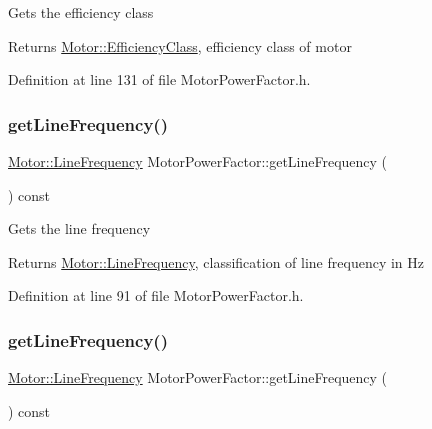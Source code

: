 Gets the efficiency class

\begin{DoxyReturn}{Returns}
\hyperlink{class_motor_afa022971ae062406a9f588c601673d4e}{Motor\+::\+Efficiency\+Class}, efficiency class of motor 
\end{DoxyReturn}


Definition at line 131 of file Motor\+Power\+Factor.\+h.

\mbox{\label{class_motor_power_factor_aa4cdc420b1f611bcb9f4a69c69c1fabf}} 
\subsubsection{\texorpdfstring{get\+Line\+Frequency()}{getLineFrequency()}\hspace{0.1cm}{\footnotesize\ttfamily [1/3]}}
{\footnotesize\ttfamily \hyperlink{class_motor_acee1bdf1b684ad36cb80dc2829d9fcee}{Motor\+::\+Line\+Frequency} Motor\+Power\+Factor\+::get\+Line\+Frequency (\begin{DoxyParamCaption}{ }\end{DoxyParamCaption}) const\hspace{0.3cm}{\ttfamily [inline]}}

Gets the line frequency

\begin{DoxyReturn}{Returns}
\hyperlink{class_motor_acee1bdf1b684ad36cb80dc2829d9fcee}{Motor\+::\+Line\+Frequency}, classification of line frequency in Hz 
\end{DoxyReturn}


Definition at line 91 of file Motor\+Power\+Factor.\+h.

\mbox{\label{class_motor_power_factor_aa4cdc420b1f611bcb9f4a69c69c1fabf}} 
\subsubsection{\texorpdfstring{get\+Line\+Frequency()}{getLineFrequency()}\hspace{0.1cm}{\footnotesize\ttfamily [2/3]}}
{\footnotesize\ttfamily \hyperlink{class_motor_acee1bdf1b684ad36cb80dc2829d9fcee}{Motor\+::\+Line\+Frequency} Motor\+Power\+Factor\+::get\+Line\+Frequency (\begin{DoxyParamCaption}{ }\end{DoxyParamCaption}) const\hspace{0.3cm}{\ttfamily [inline]}}

